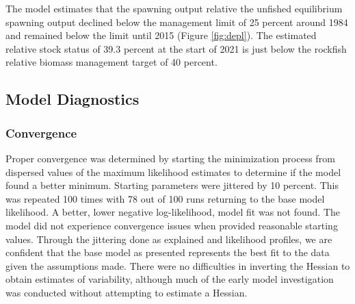 \documentclass[11pt,
  english,
  a4paper,
]{article}
\begin{document}
\leavevmode\tagmcend\tagstructend\par


The model estimates that the spawning output relative the unfished equilibrium spawning output declined below the management limit of 25 percent around 1984 and remained below the limit until 2015 (Figure \ref{fig:depl}). The estimated relative stock status of 39.3 percent at the start of 2021 is just below the rockfish relative biomass management target of 40 percent.

\leavevmode\tagmcend\tagstructend\par


\hypertarget{model-diagnostics}{%
\subsection{Model Diagnostics}\label{model-diagnostics}}

\leavevmode\tagmcend\tagstructend


\hypertarget{convergence}{%
\subsubsection{Convergence}\label{convergence}}

\leavevmode\tagmcend\tagstructend


Proper convergence was determined by starting the minimization process from dispersed values of the maximum likelihood estimates to determine if the model found a better minimum. Starting parameters were jittered by 10 percent. This was repeated 100 times with 78 out of 100 runs returning to the base model likelihood. A better, lower negative log-likelihood, model fit was not found. The model did not experience convergence issues when provided reasonable starting values. Through the jittering done as explained and likelihood profiles, we are confident that the base model as presented represents the best fit to the data given the assumptions made. There were no difficulties in inverting the Hessian to obtain estimates of variability, although much of the early model investigation was conducted without attempting to estimate a Hessian.

\leavevmode\tagmcend\tagstructend\par
\end{document}
